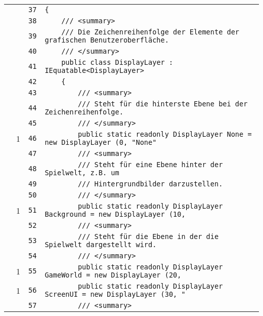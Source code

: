 \documentclass[a4paper,10pt]{article}
\begin{document}
\begin{longtable}[l]{lrrl}
\cellcolor{gray} &  & \verb~37~ & \verb~{~\\
\cellcolor{gray} &  & \verb~38~ & \verb~    /// <summary>~\\
\cellcolor{gray} &  & \verb~39~ & \verb~    /// Die Zeichenreihenfolge der Elemente der grafischen Benutzeroberfläche.~\\
\cellcolor{gray} &  & \verb~40~ & \verb~    /// </summary>~\\
\cellcolor{gray} &  & \verb~41~ & \verb~    public class DisplayLayer : IEquatable<DisplayLayer>~\\
\cellcolor{gray} &  & \verb~42~ & \verb~    {~\\
\cellcolor{gray} &  & \verb~43~ & \verb~        /// <summary>~\\
\cellcolor{gray} &  & \verb~44~ & \verb~        /// Steht für die hinterste Ebene bei der Zeichenreihenfolge.~\\
\cellcolor{gray} &  & \verb~45~ & \verb~        /// </summary>~\\
\cellcolor{green} & 1 & \verb~46~ & \verb~        public static readonly DisplayLayer None = new DisplayLayer (0, "None"~\\
\cellcolor{gray} &  & \verb~47~ & \verb~        /// <summary>~\\
\cellcolor{gray} &  & \verb~48~ & \verb~        /// Steht für eine Ebene hinter der Spielwelt, z.B. um~\\
\cellcolor{gray} &  & \verb~49~ & \verb~        /// Hintergrundbilder darzustellen.~\\
\cellcolor{gray} &  & \verb~50~ & \verb~        /// </summary>~\\
\cellcolor{green} & 1 & \verb~51~ & \verb~        public static readonly DisplayLayer Background = new DisplayLayer (10,~\\
\cellcolor{gray} &  & \verb~52~ & \verb~        /// <summary>~\\
\cellcolor{gray} &  & \verb~53~ & \verb~        /// Steht für die Ebene in der die Spielwelt dargestellt wird.~\\
\cellcolor{gray} &  & \verb~54~ & \verb~        /// </summary>~\\
\cellcolor{green} & 1 & \verb~55~ & \verb~        public static readonly DisplayLayer GameWorld = new DisplayLayer (20, ~\\
\cellcolor{green} & 1 & \verb~56~ & \verb~        public static readonly DisplayLayer ScreenUI = new DisplayLayer (30, "~\\
\cellcolor{gray} &  & \verb~57~ & \verb~        /// <summary>~\\

\end{longtable}
\end{document}
